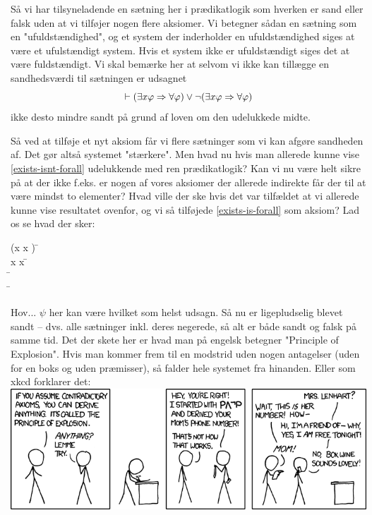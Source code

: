 Så vi har tilsyneladende en sætning her i prædikatlogik som hverken er sand eller falsk uden at vi tilføjer nogen flere aksiomer.
Vi betegner sådan en sætning som en "ufuldstændighed"{},
og et system der inderholder en ufuldstændighed siges at være et ufulstændigt system.
Hvis et system ikke er ufuldstændigt siges det at være fuldstændigt.
Vi skal bemærke her at selvom vi ikke kan tillægge en sandhedsværdi til sætningen er udsagnet
\[
	\vdash (\exists x \varphi \Rightarrow \forall \varphi) \lor \neg(\exists x \varphi \Rightarrow \forall \varphi)
\]
ikke desto mindre sandt på grund af loven om den udelukkede midte.

Så ved at tilføje et nyt aksiom får vi flere sætninger som vi kan afgøre sandheden af. Det gør altså systemet "stærkere".
Men hvad nu hvis man allerede kunne vise \eqref{exists-isnt-forall} udelukkende med ren prædikatlogik?
Kan vi nu være helt sikre på at der ikke f.eks. er nogen af vores aksiomer der allerede indirekte får der til at være mindst
to elementer? Hvad ville der ske hvis det var tilfældet at vi allerede kunne vise resultatet ovenfor, og vi så tilføjede
\eqref{exists-is-forall} som aksiom? Lad os se hvad der sker:
\begin{proofbox}
	\: \neg(\exists x \phi \imp \forall x \phi) \=  \\
	\: \exists x \phi \imp \forall x \phi \=  \\
	\: \bot \=  \\
	\: \psi \= 
\end{proofbox}
Hov... $\psi$ her kan være hvilket som helst udsagn. Så nu er  ligepludselig blevet sandt -- dvs. alle sætninger inkl. deres negerede,
så alt er både sandt og falsk på samme tid. Det der skete her er hvad man på engelsk betegner "Principle of Explosion"{}. Hvis man kommer frem til en
modstrid uden nogen antagelser (uden for en boks og uden præmisser), så falder hele systemet fra hinanden. Eller som xkcd forklarer det:
\\\includegraphics[width=\textwidth]{principle_of_explosion.png}

